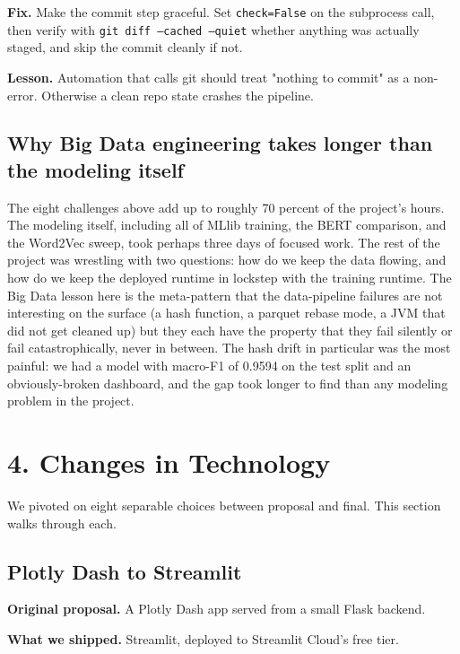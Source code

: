 \documentclass[11pt,letterpaper]{article}
\begin{document}
\textbf{Fix.} Make the commit step graceful. Set \texttt{check=False} on the subprocess call, then verify with \texttt{git diff --cached --quiet} whether anything was actually staged, and skip the commit cleanly if not.

\textbf{Lesson.} Automation that calls git should treat "nothing to commit" as a non-error. Otherwise a clean repo state crashes the pipeline.

\subsection{Why Big Data engineering takes longer than the modeling itself}

The eight challenges above add up to roughly 70 percent of the project's hours. The modeling itself, including all of MLlib training, the BERT comparison, and the Word2Vec sweep, took perhaps three days of focused work. The rest of the project was wrestling with two questions: how do we keep the data flowing, and how do we keep the deployed runtime in lockstep with the training runtime. The Big Data lesson here is the meta-pattern that the data-pipeline failures are not interesting on the surface (a hash function, a parquet rebase mode, a JVM that did not get cleaned up) but they each have the property that they fail silently or fail catastrophically, never in between. The hash drift in particular was the most painful: we had a model with macro-F1 of 0.9594 on the test split and an obviously-broken dashboard, and the gap took longer to find than any modeling problem in the project.

\newpage
\section{4. Changes in Technology}

We pivoted on eight separable choices between proposal and final. This section walks through each.

\subsection{Plotly Dash to Streamlit}

\textbf{Original proposal.} A Plotly Dash app served from a small Flask backend.

\textbf{What we shipped.} Streamlit, deployed to Streamlit Cloud's free tier.
\end{document}
